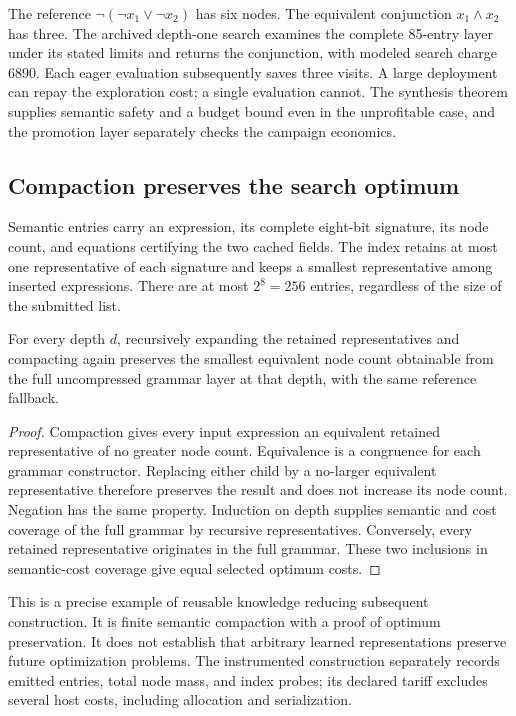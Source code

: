 \begin{example}
The reference $\neg(\neg x_1\vee\neg x_2)$ has six nodes. The equivalent conjunction $x_1\wedge x_2$ has three. The archived depth-one search examines the complete 85-entry layer under its stated limits and returns the conjunction, with modeled search charge $6890$. Each eager evaluation subsequently saves three visits. A large deployment can repay the exploration cost; a single evaluation cannot. The synthesis theorem supplies semantic safety and a budget bound even in the unprofitable case, and the promotion layer separately checks the campaign economics.
\end{example}

\subsection{Compaction preserves the search optimum}

Semantic entries carry an expression, its complete eight-bit signature, its node count, and equations certifying the two cached fields. The index retains at most one representative of each signature and keeps a smallest representative among inserted expressions. There are at most $2^8=256$ entries, regardless of the size of the submitted list.

\begin{proposition}
For every depth $d$, recursively expanding the retained representatives and compacting again preserves the smallest equivalent node count obtainable from the full uncompressed grammar layer at that depth, with the same reference fallback.
\end{proposition}
\begin{proof}
Compaction gives every input expression an equivalent retained representative of no greater node count. Equivalence is a congruence for each grammar constructor. Replacing either child by a no-larger equivalent representative therefore preserves the result and does not increase its node count. Negation has the same property. Induction on depth supplies semantic and cost coverage of the full grammar by recursive representatives. Conversely, every retained representative originates in the full grammar. These two inclusions in semantic-cost coverage give equal selected optimum costs.
\end{proof}

This is a precise example of reusable knowledge reducing subsequent construction. It is finite semantic compaction with a proof of optimum preservation. It does not establish that arbitrary learned representations preserve future optimization problems. The instrumented construction separately records emitted entries, total node mass, and index probes; its declared tariff excludes several host costs, including allocation and serialization.

